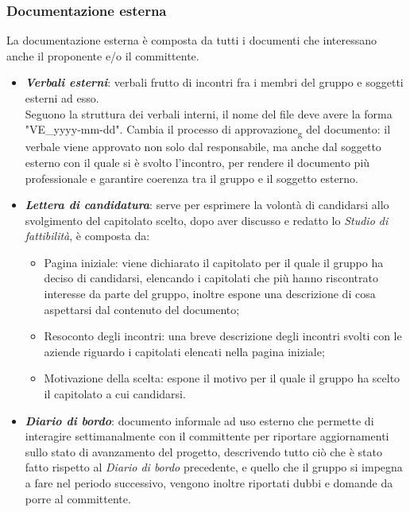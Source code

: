 \subsubsection{Documentazione esterna}
La documentazione esterna è composta da tutti i documenti che interessano anche
il proponente e/o il committente.
\begin{itemize}
      \item \textit{\textbf{Verbali esterni}}: verbali frutto di incontri fra i membri del gruppo e soggetti esterni ad esso.\\
            Seguono la struttura dei verbali interni, il nome del file deve avere la forma "VE\_yyyy-mm-dd". Cambia il processo di approvazione\textsubscript{g} del documento:
            il verbale viene approvato non solo dal responsabile, ma anche dal soggetto esterno con il quale si è svolto l'incontro,
            per rendere il documento più professionale e garantire coerenza tra il gruppo e il soggetto esterno.
      \item \textit{\textbf{Lettera di candidatura}}: serve per esprimere la volontà di candidarsi allo svolgimento del capitolato scelto, dopo aver discusso e redatto lo \textit{Studio di fattibilità},
            è composta da:
            \begin{itemize}
                  \item Pagina iniziale: viene dichiarato il capitolato per il quale il gruppo ha
                        deciso di candidarsi, elencando i capitolati che più hanno riscontrato
                        interesse da parte del gruppo, inoltre espone una descrizione di cosa
                        aspettarsi dal contenuto del documento;
                  \item Resoconto degli incontri: una breve descrizione degli incontri svolti con le
                        aziende riguardo i capitolati elencati nella pagina iniziale;
                  \item Motivazione della scelta: espone il motivo per il quale il gruppo ha scelto il
                        capitolato a cui candidarsi.
            \end{itemize}
      \item \textit{\textbf{Diario di bordo}}: documento informale ad uso esterno che permette di interagire settimanalmente con il committente per riportare aggiornamenti sullo stato di
            avanzamento del progetto, descrivendo tutto ciò che è stato fatto rispetto al \textit{Diario di bordo} precedente,
            e quello che il gruppo si impegna a fare nel periodo successivo, vengono inoltre riportati dubbi e domande da porre al committente.

\end{itemize}
